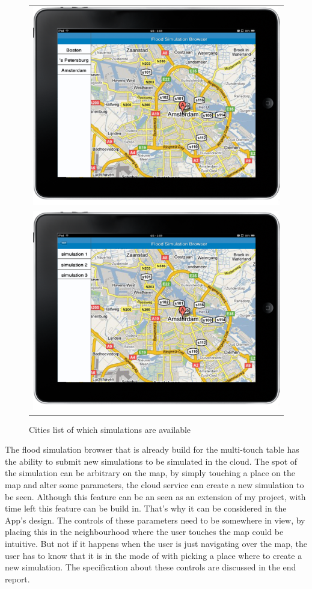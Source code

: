 \begin{figure}[ht]
\center
\begin{tabular}{c}
	\includegraphics[scale=0.3]{mockup1_1.png} \\
	\includegraphics[scale=0.3]{mockup2_1.png}
\end{tabular}
\label{fig:mockup}
\caption{Cities list of which simulations are available}
\end{figure}

The flood simulation browser that is already build for the multi-touch table has the ability to submit new simulations to be simulated in the cloud. The spot of the simulation can be arbitrary on the map, by simply touching a place on the map and alter some parameters, the cloud service can create a new simulation to be seen. Although this feature can be an seen as an extension of my project, with time left this feature can be build in. That's why it can be considered in the App's design. The controls of these parameters need to be somewhere in view, by placing this in the neighbourhood where the user touches the map could be intuitive. But not if it happens when the user is just navigating over the map, the user has to know that it is in the mode of with picking a place where to create a new simulation. The specification about these controls are discussed in the end report.

